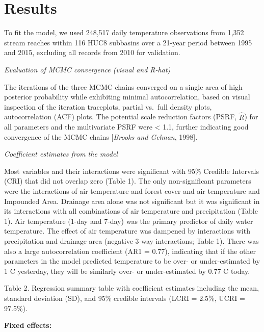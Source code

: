 \section{Results}\label{results}

To fit the model, we used 248,517 daily temperature observations from
1,352 stream reaches within 116 HUC8 subbasins over a 21-year period
between 1995 and 2015, excluding all records from 2010 for validation.

\emph{Evaluation of MCMC convergence (visual and R-hat)}

The iterations of the three MCMC chains converged on a single area of
high posterior probability while exhibiting minimal autocorrelation,
based on visual inspection of the iteration traceplots, partial vs.~full
density plots, autocorrelation (ACF) plots. The potential scale
reduction factors (PSRF, \(\hat{R}\)) for all parameters and the
multivariate PSRF were \textless{} 1.1, further indicating good
convergence of the MCMC chains {[}\emph{Brooks and Gelman}, 1998{]}.

\emph{Coefficient estimates from the model}

Most variables and their interactions were significant with 95\%
Credible Intervals (CRI) that did not overlap zero (Table 1). The only
non-significant parameters were the interactions of air temperature and
forest cover and air temperature and Impounded Area. Drainage area alone
was not significant but it was significant in its interactions with all
combinations of air temperature and precipitation (Table 1). Air
temperature (1-day and 7-day) was the primary predictor of daily water
temperature. The effect of air temperature was dampened by interactions
with precipitation and drainage area (negative 3-way interactions; Table
1). There was also a large autocorrelation coefficient (AR1 = 0.77),
indicating that if the other parameters in the model predicted
temperature to be over- or under-estimated by 1 C yesterday, they will
be similarly over- or under-estimated by 0.77 C today.

Table 2. Regression summary table with coefficient estimates including
the mean, standard deviation (SD), and 95\% credible intervals (LCRI =
2.5\%, UCRI = 97.5\%).

\textbf{Fixed effects:}

